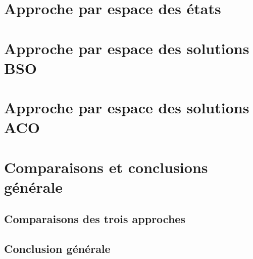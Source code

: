 \documentclass[12pt]{report}
\begin{document}
\hypersetup{hidelinks}
 
\tableofcontents

\newpage

\part{Approche par espace des états}\label{part1} 

\newpage

\newpage

\newpage

\part{Approche par espace des solutions BSO}



\part{Approche par espace des solutions ACO}



\part{Comparaisons et conclusions générale}
\chapter{Comparaisons des trois approches}
\chapter{Conclusion générale}
\paragraph{}
\listoffigures
\listoftables


\end{document}
